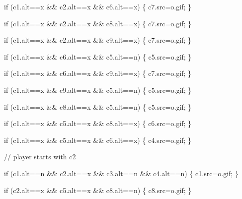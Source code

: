 \documentclass[
]{article}
\begin{document}
if (c1.alt==\textquotesingle x\textquotesingle{} \&\&
c2.alt==\textquotesingle x\textquotesingle{} \&\&
c6.alt==\textquotesingle x\textquotesingle) \{
c7.src=\textquotesingle o.gif\textquotesingle; \}

if (c1.alt==\textquotesingle x\textquotesingle{} \&\&
c2.alt==\textquotesingle x\textquotesingle{} \&\&
c8.alt==\textquotesingle x\textquotesingle) \{
c7.src=\textquotesingle o.gif\textquotesingle; \}

if (c1.alt==\textquotesingle x\textquotesingle{} \&\&
c2.alt==\textquotesingle x\textquotesingle{} \&\&
c9.alt==\textquotesingle x\textquotesingle) \{
c7.src=\textquotesingle o.gif\textquotesingle; \}

if (c1.alt==\textquotesingle x\textquotesingle{} \&\&
c6.alt==\textquotesingle x\textquotesingle{} \&\&
c5.alt==\textquotesingle n\textquotesingle) \{
c5.src=\textquotesingle o.gif\textquotesingle; \}

if (c1.alt==\textquotesingle x\textquotesingle{} \&\&
c6.alt==\textquotesingle x\textquotesingle{} \&\&
c9.alt==\textquotesingle x\textquotesingle) \{
c7.src=\textquotesingle o.gif\textquotesingle; \}

if (c1.alt==\textquotesingle x\textquotesingle{} \&\&
c9.alt==\textquotesingle x\textquotesingle{} \&\&
c5.alt==\textquotesingle n\textquotesingle) \{
c5.src=\textquotesingle o.gif\textquotesingle; \}

if (c1.alt==\textquotesingle x\textquotesingle{} \&\&
c8.alt==\textquotesingle x\textquotesingle{} \&\&
c5.alt==\textquotesingle n\textquotesingle) \{
c5.src=\textquotesingle o.gif\textquotesingle; \}

if (c1.alt==\textquotesingle x\textquotesingle{} \&\&
c5.alt==\textquotesingle x\textquotesingle{} \&\&
c8.alt==\textquotesingle x\textquotesingle) \{
c6.src=\textquotesingle o.gif\textquotesingle; \}

if (c1.alt==\textquotesingle x\textquotesingle{} \&\&
c5.alt==\textquotesingle x\textquotesingle{} \&\&
c6.alt==\textquotesingle x\textquotesingle) \{
c4.src=\textquotesingle o.gif\textquotesingle; \}

// player starts with c2

if (c1.alt==\textquotesingle n\textquotesingle{} \&\&
c2.alt==\textquotesingle x\textquotesingle{} \&\&
c3.alt==\textquotesingle n\textquotesingle{} \&\&
c4.alt==\textquotesingle n\textquotesingle) \{
c1.src=\textquotesingle o.gif\textquotesingle; \}

if (c2.alt==\textquotesingle x\textquotesingle{} \&\&
c5.alt==\textquotesingle x\textquotesingle{} \&\&
c8.alt==\textquotesingle n\textquotesingle) \{
c8.src=\textquotesingle o.gif\textquotesingle; \}
\end{document}
